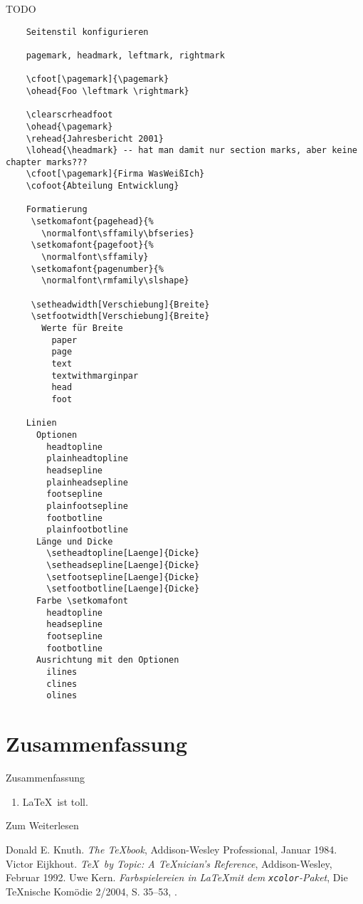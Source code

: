 \begin{Frame}{TODO}
  \begin{verbatim}
    Seitenstil konfigurieren

    pagemark, headmark, leftmark, rightmark

    \cfoot[\pagemark]{\pagemark}
    \ohead{Foo \leftmark \rightmark}
    
    \clearscrheadfoot
    \ohead{\pagemark}
    \rehead{Jahresbericht 2001}
    \lohead{\headmark} -- hat man damit nur section marks, aber keine chapter marks???
    \cfoot[\pagemark]{Firma WasWeißIch}
    \cofoot{Abteilung Entwicklung}
    
    Formatierung
     \setkomafont{pagehead}{%
       \normalfont\sffamily\bfseries}
     \setkomafont{pagefoot}{%
       \normalfont\sffamily}
     \setkomafont{pagenumber}{%
       \normalfont\rmfamily\slshape}
    
     \setheadwidth[Verschiebung]{Breite}
     \setfootwidth[Verschiebung]{Breite}
       Werte für Breite
         paper
         page
         text
         textwithmarginpar
         head
         foot
    
    Linien
      Optionen
        headtopline
        plainheadtopline
        headsepline
        plainheadsepline
        footsepline
        plainfootsepline
        footbotline
        plainfootbotline
      Länge und Dicke
        \setheadtopline[Laenge]{Dicke}
        \setheadsepline[Laenge]{Dicke}
        \setfootsepline[Laenge]{Dicke}
        \setfootbotline[Laenge]{Dicke}
      Farbe \setkomafont
        headtopline
        headsepline
        footsepline
        footbotline
      Ausrichtung mit den Optionen
        ilines
        clines
        olines
  \end{verbatim}
\end{Frame}

\section*{Zusammenfassung}

\begin{frame}{Zusammenfassung}
  \begin{enumerate}
    \item \LaTeX\ ist toll.
  \end{enumerate}
\end{frame}

\begin{Frame}[fragile]{Zum Weiterlesen}
  \begin{mybib}
      Donald E. Knuth.
      \newblock \emph{The \TeX book},
      \newblock Addison-Wesley Professional, Januar 1984.
      Victor Eijkhout.
      \newblock \emph{\TeX\ by Topic: A \TeX nician's Reference},
      \newblock Addison-Wesley, Februar 1992.
      Uwe Kern.
      \newblock \emph{Farbspielereien in \LaTeX mit dem \texttt{xcolor}-Paket},
      \newblock Die \TeX nische Komödie 2/2004, S. 35--53,
      \newblock {}.
  \end{mybib}
\end{Frame}